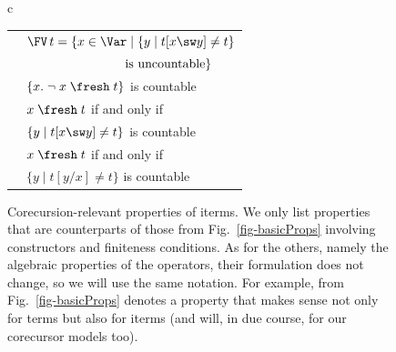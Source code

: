 \begin{figure}
{\begin{tabular}{c}
\begin{tabular}{|c|l|}
    \textrm{\IFvDSw}  &
    $\FV\,t = \{x\in \Var \mid \{y \mid t[x \sw y] \not= t\}$ 
    \\
    & 
    $\hspace*{17.2ex}\mbox{ is uncountable} \}
    $
    \\\hline 
	\textrm{\IFSupFr}  	&   
	$\{x.\;\neg\;x \;\fresh\;t\}$ is countable
	\\\hline 
	\textrm{\IFrDSw}  &
	$x\;\fresh\;t $ if and only if 
	\\& $\{y \mid t[x \sw y] \not= t\}$ is countable 
	\\\hline 
	\textrm{\IFrDRn}  &
	$x\;\fresh\;t $ if and only if 
	\\& $\{y \mid t[y / x] \not= t\}$ is countable 
	\\\hline
\end{tabular}
\end{tabular} 
} %
\vspace*{-0.3ex}
\caption{Corecursion-relevant properties of 
	iterms. %
We only list properties that are %
counterparts of those from Fig.~\ref{fig-basicProps} involving constructors 
and finiteness conditions. As for the others, 
namely the algebraic properties of the operators,  
their formulation does not change, so we will use the same notation.
%
For example, \SwId{} %
from Fig.~\ref{fig-basicProps} denotes a property that makes sense not only for terms but also for iterms (and will, in due course, for our corecursor models too). 
%
%
}
\label{fig-basicCoProps}
\vspace*{-4ex}
\end{figure} 

